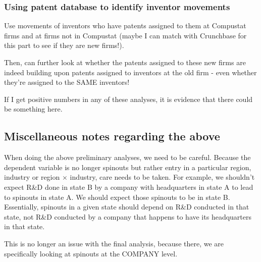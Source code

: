 \documentclass[12pt,english]{article}
\theoremstyle{remark}
\begin{document}
\subsubsection{Using patent database to identify inventor movements}
Use movements of inventors who have patents assigned to them at Compustat firms and at firms not in Compustat (maybe I can match with Crunchbase for this part to see if they are new firms!).

Then, can further look at whether the patents assigned to these new firms are indeed building upon patents assigned to inventors at the old firm - even whether they're assigned to the SAME inventors!

If I get positive numbers in any of these analyses, it is evidence that there could be something here. 

\subsection{Miscellaneous notes regarding the above}

When doing the above preliminary analyses, we need to be careful. Because the dependent variable is no longer spinouts but rather entry in a particular region, industry or region $\times$ industry, care needs to be taken. For example, we shouldn't expect R\&D done in state B by a company with headquarters in state A to lead to spinouts in state A. We should expect those spinouts to be in state B. Essentially, spinouts in a given state should depend on R\&D conducted in that state, not R\&D conducted by a company that happens to have its headquarters in that state. 

This is no longer an issue with the final analysis, because there, we are specifically looking at spinouts at the COMPANY level.
\end{document}
